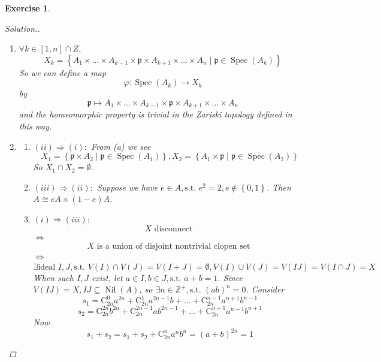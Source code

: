\documentclass{article}
\theoremstyle{breakstyle}
\newtheorem{exercise}{Exercise}
\newenvironment{solution}
  {\begin{proof}[Solution.]\renewcommand{\qedsymbol}{}}
  {\end{proof}}
\DeclareMathOperator{\nil}{Nil}
\DeclareMathOperator{\spec}{Spec}
\begin{document}
\begin{exercise}
\begin{solution}
    \begin{enumerate}[label=({\alph*})]
            \item $\forall k\in [1,n]\cap Z$,
                $$
                X_{k}=\left\{ A_1\times \ldots \times A_{k-1}\times \mathfrak{p}\times A_{k+1}\times \ldots \times A_{n}\mid \mathfrak{p}\in \spec(A_{k}) \right\} 
                $$
                So we can define a map
                $$
                \varphi:\spec(A_{k})\longrightarrow X_{k}
                $$
                by
                $$
                \mathfrak{p}\longmapsto A_1\times \ldots \times A_{k-1}\times \mathfrak{p}\times A_{k+1}\times \ldots \times A_{n}
                $$
                and the homeomorphic property is trivial in the Zariski topology defined in this way.
            \item 
                \begin{enumerate}[label=({\Roman*})]
                    \item $(ii)\Rightarrow(i):$
                        From \emph{(a)} we see
                        $$
                        X_1=\left\{ \mathfrak{p}\times A_2\mid \mathfrak{p}\in \spec(A_1) \right\} ,X_2=\left\{ A_1\times \mathfrak{p}\mid \mathfrak{p}\in \spec(A_2) \right\} 
                        $$
                        So $X_1\cap X_2=\emptyset$.
                    \item $(iii)\Rightarrow(ii):$
                        Suppose we have $e\in A,\text{s.t. }e^2=2,e\not\in \left\{ 0,1 \right\} $.
                        Then $A\cong eA\times (1-e)A$.
                    \item $(i)\Rightarrow(iii):$
                        $$
                        X\text{ disconnect }
                        $$
                        $\Leftrightarrow$
                        $$
                        X\text{ is a union of disjoint nontrivial clopen set }
                        $$
                        $\Leftrightarrow$ 
                        $$
                        \exists \text{ideal }I,J,\text{s.t. }V(I)\cap V(J)=V(I+J)=\emptyset,V(I)\cup V(J)=V(IJ)=V(I\cap J)=X
                        $$
                        When such $I,J$ exist, let $a\in I,b\in J,\text{s.t. }a+b=1$.
                        Since $V(IJ)=X,IJ\subseteq \nil(A)$, so $\exists n\in \mathbb{Z}^{+},\text{s.t. }(ab)^{n}=0$.
                        Consider
                        $$
                        s_1=\mathrm{C}_{2n}^{0}a^{2n}+\mathrm{C}_{2n}^{1}a^{2n-1}b+\ldots +\mathrm{C}_{2n}^{n-1}a^{n+1}b^{n-1}
                        $$
                        $$
                        s_2=\mathrm{C}_{2n}^{2n}b^{2n}+\mathrm{C}_{2n}^{2n-1}ab^{2n-1}+\ldots +\mathrm{C}_{2n}^{n+1}a^{n-1}b^{n+1}
                        $$
                        Now
                        $$
                        s_1+s_2=s_1+s_2+\mathrm{C}_{2n}^{n}a^{n}b^{n}=(a+b)^{2n}=1
                        $$


\end{enumerate}
\end{enumerate}
\end{solution}
\end{exercise}
\end{document}
